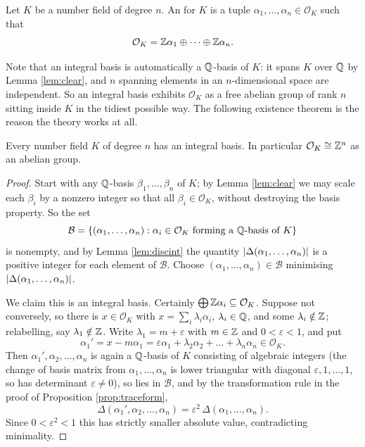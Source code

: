 \documentclass[a4paper]{scrartcl}
\renewcommand{\OO}{\mathcal{O}}
\begin{document}
\begin{definition}
	Let $K$ be a number field of degree $n$. An  for $K$ is a tuple $\alpha_1, \dots, \alpha_n \in \OO_K$ such that
	$$\OO_K = \Z\alpha_1 \oplus \dots \oplus \Z\alpha_n.$$
\end{definition}

Note that an integral basis is automatically a $\mathbb{Q}$-basis of $K$: it spans $K$ over $\mathbb{Q}$ by Lemma \ref{lem:clear}, and $n$ spanning elements in an $n$-dimensional space are independent. So an integral basis exhibits $\OO_K$ as a free abelian group of rank $n$ sitting inside $K$ in the tidiest possible way. The following existence theorem is the reason the theory works at all.

\begin{theorem}\label{thm:intbasis}
	Every number field $K$ of degree $n$ has an integral basis. In particular $\OO_K \cong \Z^n$ as an abelian group.
\end{theorem}

\begin{proof}
	Start with any $\mathbb{Q}$-basis $\beta_1, \dots, \beta_n$ of $K$; by Lemma \ref{lem:clear} we may scale each $\beta_i$ by a nonzero integer so that all $\beta_i \in \OO_K$, without destroying the basis property. So the set
	$$\mathcal{B} = \{(\alpha_1, \dots, \alpha_n) : \alpha_i \in \OO_K \text{ forming a } \Q\text{-basis of } K\}$$
	is nonempty, and by Lemma \ref{lem:discint} the quantity $\lvert\Delta(\alpha_1,\dots,\alpha_n)\rvert$ is a positive integer for each element of $\mathcal B$. Choose $(\alpha_1, \dots, \alpha_n) \in \mathcal B$ minimising $\lvert\Delta(\alpha_1,\dots,\alpha_n)\rvert$.

	We claim this is an integral basis. Certainly $\bigoplus \Z\alpha_i \subseteq \OO_K$. Suppose not conversely, so there is $x \in \OO_K$ with $x = \sum_i\lambda_i\alpha_i$, $\lambda_i \in \mathbb{Q}$, and some $\lambda_i \notin \mathbb{Z}$; relabelling, say $\lambda_1 \notin \mathbb{Z}$. Write $\lambda_1 = m + \varepsilon$ with $m \in \mathbb{Z}$ and $0 < \varepsilon < 1$, and put
	$$\alpha_1' = x - m\alpha_1 = \varepsilon\alpha_1 + \lambda_2\alpha_2 + \dots + \lambda_n\alpha_n \in \OO_K.$$
	Then $\alpha_1', \alpha_2, \dots, \alpha_n$ is again a $\mathbb{Q}$-basis of $K$ consisting of algebraic integers (the change of basis matrix from $\alpha_1,\dots,\alpha_n$ is lower triangular with diagonal $\varepsilon, 1, \dots, 1$, so has determinant $\varepsilon \neq 0$), so lies in $\mathcal B$, and by the transformation rule in the proof of Proposition \ref{prop:traceform},
	$$\Delta(\alpha_1',\alpha_2,\dots,\alpha_n) = \varepsilon^2\,\Delta(\alpha_1,\dots,\alpha_n).$$
	Since $0 < \varepsilon^2 < 1$ this has strictly smaller absolute value, contradicting minimality.
\end{proof}
\end{document}
